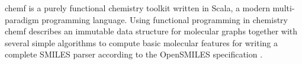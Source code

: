 chemf  is a purely functional chemistry toolkit written in Scala, a modern multi-paradigm programming language. Using functional programming in chemistry chemf describes an immutable data structure for molecular graphs together with several simple algorithms to compute basic molecular features for writing a complete SMILES parser according to the OpenSMILES specification \cite{H_ck_2012}. 
